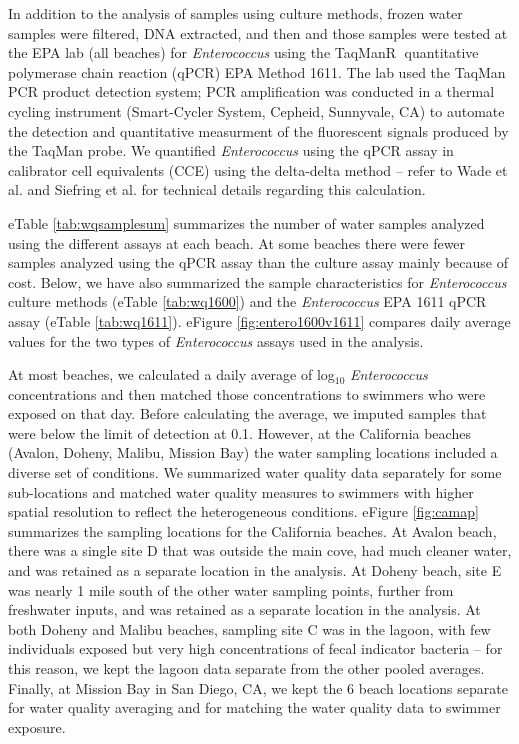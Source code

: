 \documentclass[12pt]{article}\usepackage[]{graphicx}\usepackage[]{color}
\begin{document}
In addition to the analysis of samples using culture methods, frozen water samples were filtered, DNA extracted, and then and those samples were tested at the EPA lab (all beaches) for \textit{Enterococcus} using the TaqMan\textcircled{R} quantitative polymerase chain reaction (qPCR) EPA Method 1611.\supercite{Epa2012-fb} The lab used the TaqMan PCR product detection system; PCR amplification was conducted in a thermal cycling instrument (Smart-Cycler System, Cepheid, Sunnyvale, CA) to automate the detection and quantitative measurment of the fluorescent signals produced by the TaqMan probe. We quantified \textit{Enterococcus} using the qPCR assay in calibrator cell equivalents (CCE) using the delta-delta method -- refer to Wade et al.\supercite{Wade2010-bb} and Siefring et al.\supercite{Siefring2008-au} for technical details regarding this calculation.  

eTable \ref{tab:wqsamplesum} summarizes the number of water samples analyzed using the different assays at each beach. At some beaches there were fewer samples analyzed using the qPCR assay than the culture assay mainly because of cost. Below, we have also summarized the sample characteristics for \emph{Enterococcus} culture methods (eTable \ref{tab:wq1600}) and the \emph{Enterococcus} EPA 1611 qPCR assay (eTable \ref{tab:wq1611}). eFigure \ref{fig:entero1600v1611} compares daily average values for the two types of \textit{Enterococcus} assays used in the analysis.

At most beaches, we calculated a daily average of log$_{10}$ \textit{Enterococcus} concentrations and then matched those concentrations to swimmers who were exposed on that day.  Before calculating the average, we imputed samples that were below the limit of detection at 0.1.  However, at the California beaches (Avalon, Doheny, Malibu, Mission Bay) the water sampling locations included a diverse set of conditions. We summarized water quality data separately for some sub-locations and matched water quality measures to swimmers with higher spatial resolution to reflect the heterogeneous conditions. eFigure \ref{fig:camap} summarizes the sampling locations for the California beaches. At Avalon beach, there was a single site D that was outside the main cove, had much cleaner water, and was retained as a separate location in the analysis.  At Doheny beach,  site E was nearly 1 mile south of the other water sampling points, further from freshwater inputs, and was retained as a separate location in the analysis. At both Doheny and Malibu beaches, sampling site C was in the lagoon, with few individuals exposed but very high concentrations of fecal indicator bacteria -- for this reason, we kept the lagoon data separate from the other pooled averages. Finally, at Mission Bay in San Diego, CA, we kept the 6 beach locations separate for water quality averaging and for matching the water quality data to swimmer exposure. 
\end{document}
